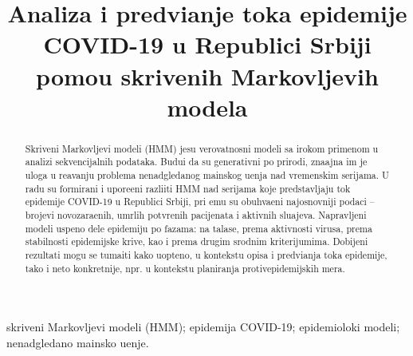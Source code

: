 \documentclass[cyr]{simposium}
\begin{document}
\begin{frontmatter}

\title{ Analiza i predvi\dj anje toka epidemije {\Lat COVID-19} u Republici Srbiji pomo\cc u skrivenih Markovljevih modela}

\author{{ }}
\address{Matemati\ch ki fakultet, Univerzitet u Beogradu, Student{}ski trg 16, Beograd\\
}



\maketitle

\begin{abstract}
    Skriveni Markovljevi modeli ({\Lat HMM}) jesu verovatnosni modeli sa \sh irokom primenom u analizi sekvencijalnih podataka. Budu\cc i da su generativni po prirodi, zna\ch ajna im je uloga u re\sh avanju problema nenadgledanog ma\sh inskog u\ch enja nad vremenskim serijama. U radu su formirani i upore\dj eni razli\ch iti {\Lat HMM} nad serijama koje predstavljaju tok epidemije {\Lat COVID-19} u Republici Srbiji, pri \ch emu su obuhva\cc eni najosnovniji podaci -- brojevi novozara\zh enih, umrlih potvr\dj enih pacijenata i aktivnih slu\ch ajeva. Napravljeni modeli uspe\sh no dele epidemiju po fazama: na talase, prema aktivnosti virusa, prema stabilnosti epidemijske krive, kao i prema drugim srodnim kriterijumima. Dobijeni rezultati mogu se tuma\ch iti kako uop\sh teno, u kontekstu opisa i predvi\dj anja toka epidemije, tako i ne\sh to konkretnije, npr. u kontekstu planiranja protivepidemijskih mera.
\end{abstract}
\begin{keyword}
   skriveni Markovljevi modeli ({\Lat HMM}); epidemija {\Lat COVID-19}; epidemiolo\sh ki modeli; nenadgledano ma\sh insko u\ch enje.
\end{keyword}
\end{frontmatter}
\end{document}

